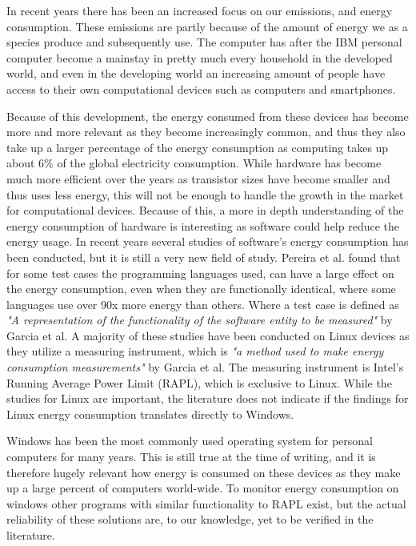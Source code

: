 In recent years there has been an increased focus on our emissions, and energy consumption. These emissions are partly because of the amount of energy we as a species produce and subsequently use. 
The computer has after the IBM personal computer become a mainstay in pretty much every household in the developed world, and even in the developing world an increasing amount of people have access to their own computational devices such as computers and smartphones\cite{DevelopedWorldPC}. 

Because of this development, the energy consumed from these devices has become more and more relevant as they become increasingly common, and thus they also take up a larger percentage of the energy consumption as computing takes up about 6\% of the global electricity consumption\cite*{somavat2011energy}.
While hardware has become much more efficient over the years as transistor sizes have become smaller and thus uses less energy, this will not be enough to handle the growth in the market for computational devices. Because of this, a more in depth understanding of the energy consumption of hardware is interesting as software could help reduce the energy usage\cite{somavat2011energy}. 
In recent years several studies of software's energy consumption has been conducted, but it is still a very new field of study. Pereira et al.\cite*{Pereira2017} found that for some test cases the programming languages used, can have a large effect on the energy consumption, even when they are functionally identical, where some languages use over 90x more energy than others. Where a test case is defined as \textit{"A representation of the functionality of the software entity to be measured"} by Garcia et al.\cite*{GarciaFEETINGS}
A majority of these studies have been conducted on Linux devices as they utilize a measuring instrument, which is \textit{"a method used to make energy consumption measurements"} by Garcia et al.\cite*{GarciaFEETINGS} The measuring instrument is Intel's Running Average Power Limit (RAPL), which is exclusive to Linux. While the studies for Linux are important, the literature does not indicate if the findings for Linux energy consumption translates directly to Windows\cite{Pereira2017}. 

Windows has been the most commonly used operating system for personal computers for many years. This is still true at the time of writing, and it is therefore hugely relevant how energy is consumed on these devices as they make up a large percent of computers world-wide\cite{OSShare}. To monitor energy consumption on windows other programs with similar functionality to RAPL exist, but the actual reliability of these solutions are, to our knowledge, yet to be verified in the literature.

